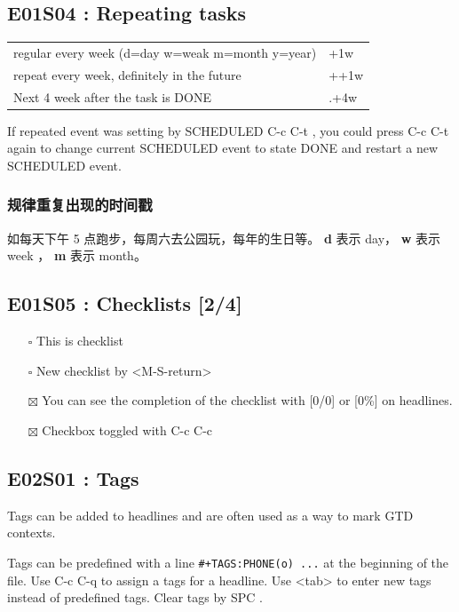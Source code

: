 \documentclass[11pt]{article}
\begin{document}
\subsection{E01S04 : Repeating tasks}
\label{sec:orgcc5daf8}
\begin{center}
\begin{tabular}{ll}
regular every week (d=day w=weak m=month y=year) & +1w\\
repeat every week, definitely in the future & ++1w\\
Next 4 week after the task is DONE & .+4w\\
\end{tabular}
\end{center}

If repeated event was setting by SCHEDULED  C-c C-t
 , you could press  C-c C-t 
again to change current SCHEDULED event to state DONE and restart a new
SCHEDULED event.

\subsubsection{规律重复出现的时间戳}
\label{sec:orgf5bfde5}
如每天下午 5 点跑步，每周六去公园玩，每年的生日等。
\textbf{d} 表示 day， \textbf{w} 表示 week ， \textbf{m} 表示 month。
\subsection{E01S05 : Checklists [2/4]}
\label{sec:org0636fd6}
\begin{itemize}
\item[{$\square$}] This is checklist
\item[{$\square$}] New checklist by  <M-S-return>
\item[{$\boxtimes$}] You can see the completion of the checklist with [0/0] or [0\%] on headlines.
\item[{$\boxtimes$}] Checkbox toggled with  C-c C-c
\end{itemize}
\subsection{E02S01 : Tags}
\label{sec:orgca57c70}
Tags can be added to headlines and are often used as a way to mark GTD contexts.

Tags can be predefined with a line \texttt{\#+TAGS:PHONE(o) ...} at the beginning of
the file. Use  C-c C-q  to assign a tags for a
headline. Use  <tab>  to enter new tags instead
of predefined tags. Clear tags by  SPC  .
\end{document}
